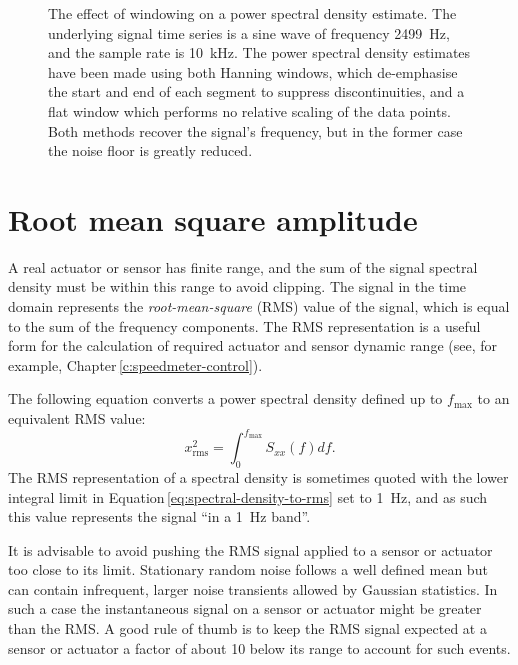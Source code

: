 \begin{figure}
  \centering
  
  \caption[The effect of windowing on a power spectral density estimate]{\label{fig:fft-windowing}The effect of windowing on a power spectral density estimate. The underlying signal time series is a sine wave of frequency \SI{2499}{\hertz}, and the sample rate is \SI{10}{\kilo\hertz}. The power spectral density estimates have been made using both Hanning windows, which de-emphasise the start and end of each segment to suppress discontinuities, and a flat window which performs no relative scaling of the data points. Both methods recover the signal's frequency, but in the former case the noise floor is greatly reduced.}
\end{figure}

\section{\label{sec:rms-amplitude}Root mean square amplitude}
A real actuator or sensor has finite range, and the sum of the signal spectral density must be within this range to avoid clipping. The signal in the time domain represents the \emph{root-mean-square} (\gls{RMS}) value of the signal, which is equal to the sum of the frequency components. The \gls{RMS} representation is a useful form for the calculation of required actuator and sensor dynamic range (see, for example, Chapter\,\ref{c:speedmeter-control}).

The following equation converts a power spectral density defined up to $f_{\text{max}}$ to an equivalent \gls{RMS} value:
\begin{equation}
  \label{eq:spectral-density-to-rms}
  x_{\text{rms}}^2 = \int^{f_{\text{max}}}_{0} S_{xx} \left( f \right) df.
\end{equation}
The \gls{RMS} representation of a spectral density is sometimes quoted with the lower integral limit in Equation\,\ref{eq:spectral-density-to-rms} set to \SI{1}{\hertz}, and as such this value represents the signal ``in a \SI{1}{\hertz} band''.

It is advisable to avoid pushing the \gls{RMS} signal applied to a sensor or actuator too close to its limit. Stationary random noise follows a well defined mean but can contain infrequent, larger noise transients allowed by Gaussian statistics. In such a case the instantaneous signal on a sensor or actuator might be greater than the \gls{RMS}. A good rule of thumb is to keep the \gls{RMS} signal expected at a sensor or actuator a factor of about \num{10} below its range to account for such events.

